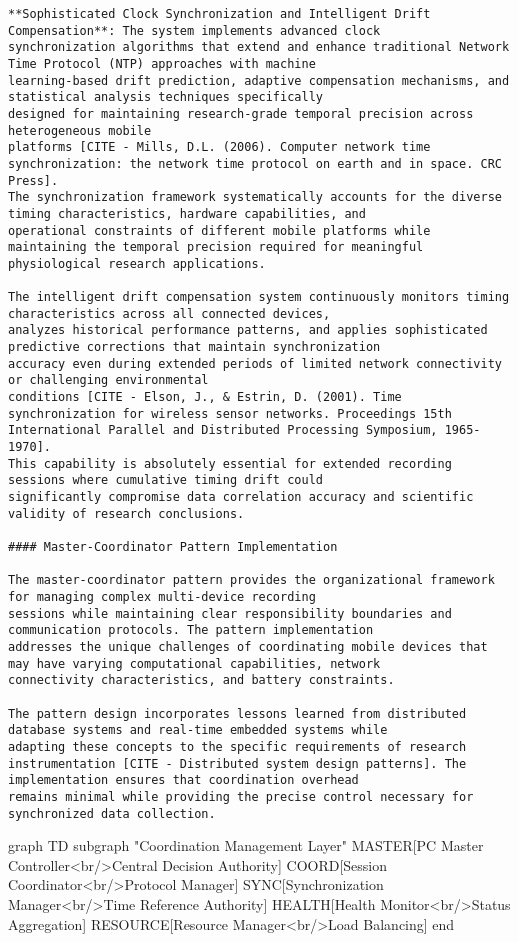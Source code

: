 \documentclass[11pt,a4paper]{report}
\begin{document}
\begin{verbatim}
**Sophisticated Clock Synchronization and Intelligent Drift Compensation**: The system implements advanced clock
synchronization algorithms that extend and enhance traditional Network Time Protocol (NTP) approaches with machine
learning-based drift prediction, adaptive compensation mechanisms, and statistical analysis techniques specifically
designed for maintaining research-grade temporal precision across heterogeneous mobile
platforms [CITE - Mills, D.L. (2006). Computer network time synchronization: the network time protocol on earth and in space. CRC Press].
The synchronization framework systematically accounts for the diverse timing characteristics, hardware capabilities, and
operational constraints of different mobile platforms while maintaining the temporal precision required for meaningful
physiological research applications.

The intelligent drift compensation system continuously monitors timing characteristics across all connected devices,
analyzes historical performance patterns, and applies sophisticated predictive corrections that maintain synchronization
accuracy even during extended periods of limited network connectivity or challenging environmental
conditions [CITE - Elson, J., & Estrin, D. (2001). Time synchronization for wireless sensor networks. Proceedings 15th International Parallel and Distributed Processing Symposium, 1965-1970].
This capability is absolutely essential for extended recording sessions where cumulative timing drift could
significantly compromise data correlation accuracy and scientific validity of research conclusions.

#### Master-Coordinator Pattern Implementation

The master-coordinator pattern provides the organizational framework for managing complex multi-device recording
sessions while maintaining clear responsibility boundaries and communication protocols. The pattern implementation
addresses the unique challenges of coordinating mobile devices that may have varying computational capabilities, network
connectivity characteristics, and battery constraints.

The pattern design incorporates lessons learned from distributed database systems and real-time embedded systems while
adapting these concepts to the specific requirements of research
instrumentation [CITE - Distributed system design patterns]. The implementation ensures that coordination overhead
remains minimal while providing the precise control necessary for synchronized data collection.

\end{verbatim}
graph TD
    subgraph "Coordination Management Layer"
        MASTER[PC Master Controller<br/>Central Decision Authority]
        COORD[Session Coordinator<br/>Protocol Manager]
        SYNC[Synchronization Manager<br/>Time Reference Authority]
        HEALTH[Health Monitor<br/>Status Aggregation]
        RESOURCE[Resource Manager<br/>Load Balancing]
    end
\end{document}
